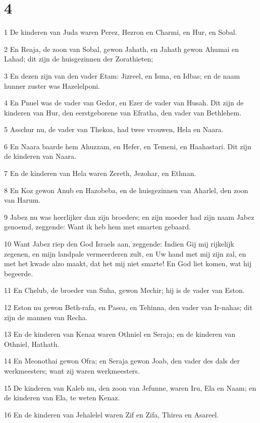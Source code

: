 \chapter{4}

\par 1 De kinderen van Juda waren Perez, Hezron en Charmi, en Hur, en Sobal.
\par 2 En Reaja, de zoon van Sobal, gewon Jahath, en Jahath gewon Ahumai en Lahad; dit zijn de huisgezinnen der Zorathieten;
\par 3 En dezen zijn van den vader Etam: Jizreel, en Isma, en Idbas; en de naam hunner zuster was Hazelelponi.
\par 4 En Pnuel was de vader van Gedor, en Ezer de vader van Husah. Dit zijn de kinderen van Hur, den eerstgeborene van Efratha, den vader van Bethlehem.
\par 5 Asschur nu, de vader van Thekoa, had twee vrouwen, Hela en Naara.
\par 6 En Naara baarde hem Ahuzzam, en Hefer, en Temeni, en Haahastari. Dit zijn de kinderen van Naara.
\par 7 En de kinderen van Hela waren Zereth, Jezohar, en Ethnan.
\par 8 En Koz gewon Anub en Hazobeba, en de huisgezinnen van Aharlel, den zoon van Harum.
\par 9 Jabez nu was heerlijker dan zijn broeders; en zijn moeder had zijn naam Jabez genoemd, zeggende: Want ik heb hem met smarten gebaard.
\par 10 Want Jabez riep den God Israels aan, zeggende: Indien Gij mij rijkelijk zegenen, en mijn landpale vermeerderen zult, en Uw hand met mij zijn zal, en met het kwade alzo maakt, dat het mij niet smarte! En God liet komen, wat hij begeerde.
\par 11 En Chelub, de broeder van Suha, gewon Mechir; hij is de vader van Eston.
\par 12 Eston nu gewon Beth-rafa, en Pasea, en Tehinna, den vader van Ir-nahas; dit zijn de mannen van Recha.
\par 13 En de kinderen van Kenaz waren Othniel en Seraja; en de kinderen van Othniel, Hathath.
\par 14 En Meonothai gewon Ofra; en Seraja gewon Joab, den vader des dals der werkmeesters; want zij waren werkmeesters.
\par 15 De kinderen van Kaleb nu, den zoon van Jefunne, waren Iru, Ela en Naam; en de kinderen van Ela, te weten Kenaz.
\par 16 En de kinderen van Jehalelel waren Zif en Zifa, Thirea en Asareel.
